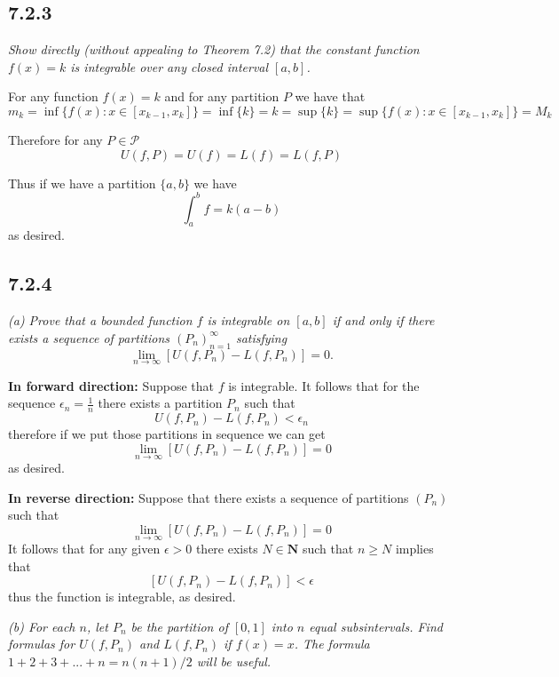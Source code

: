 \documentclass[11pt,oneside,titlepage]{book}
\begin{document}
\subsection*{7.2.3}
\textit{Show directly (without appealing to Theorem 7.2) that the
  constant function $f(x) = k$ is integrable over any closed interval $[a, b]$.}

For any function $f(x) = k$ and for any partition $P$ we have that 
$$m_k = \inf\{f(x): x \in [x_{k - 1}, x_k]\} = \inf \{k\} = k =
\sup \{k\} = \sup\{f(x): x \in [x_{k - 1}, x_k]\} = M_k$$

Therefore for any $P \in \mathcal{P}$
$$U(f, P) = U(f) = L(f) = L(f, P)$$

Thus if we have a partition $\{a, b\}$ we have
$$\int_a^b{f} = k(a - b)$$
as desired.

\subsection*{7.2.4}

\textit{(a) Prove that a bounded function $f$ is integrable on $[a, b]$ if
  and only if there exists a sequence of partitions $(P_n)_{n = 1}^{\infty}$
  satisfying }
$$\lim_{n \to \infty}{[U(f, P_n) - L(f, P_n)]} = 0.$$

\textbf{In forward direction:} Suppose that $f$ is integrable. It follows that
for the sequence $\epsilon_n = \frac{1}{n}$ there exists a partition
$P_n$ such that
$$U(f, P_n) - L(f, P_n) < \epsilon_n$$
therefore if we put those partitions in sequence we can get
$$\lim_{n \to \infty}{[U(f, P_n) - L(f, P_n)]} = 0$$
as desired.

\textbf{In reverse direction:} Suppose that there exists a sequence of
partitions $(P_n)$ such that
$$\lim_{n \to \infty}{[U(f, P_n) - L(f, P_n)]} = 0$$
It follows that for any given $\epsilon > 0$ there exists $N \in \textbf{N}$
such that $n \geq N$ implies that
$$[U(f, P_n) - L(f, P_n)] < \epsilon$$
thus the function is integrable, as desired.

\textit{(b) For each $n$, let $P_n$ be the partition of $[0, 1]$ into $n$
  equal subsintervals. Find formulas for $U(f, P_n)$ and $L(f, P_n)$ if
  $f(x) = x$. The formula $1 + 2 + 3 + ... + n = n(n + 1)/2$ will be useful.}
\end{document}
